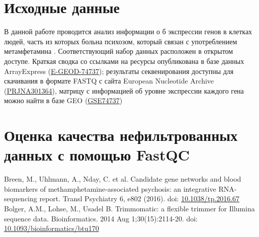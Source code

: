\documentclass[a4paper,12pt]{article}
\begin{document}


\section{Исходные данные}

В данной работе проводится анализ информации о б экспрессии генов в клетках людей, часть из которых больна психозом, который связан с употреблением метамфетамина \cite{breen}.
Соответствующий набор данных расположен в открытом доступе. Краткая сводка со ссылками на ресурсы опубликована в базе данных ArrayExpress (\href{https://www.ebi.ac.uk/arrayexpress/experiments/E-GEOD-74737/}{E-GEOD-74737}); результаты секвенирования доступны для скачивания в формате FASTQ с сайта European Nucleotide Archive (\href{https://www.ebi.ac.uk/ena/browser/view/PRJNA301364}{PRJNA301364}), матрицу с информацией об уровне экспрессии каждого гена можно найти в базе GEO (\href{https://www.ncbi.nlm.nih.gov/geo/query/acc.cgi?acc=GSE74737}{GSE74737})

\section{Оценка качества нефильтрованных данных с помощью FastQC}


\begin{thebibliography}{99}
     Breen, M., Uhlmann, A., Nday, C. et al. Candidate gene networks and blood biomarkers of methamphetamine-associated psychosis: an integrative RNA-sequencing report. Transl Psychiatry 6, e802 (2016). doi: \href{https://doi.org/10.1038/tp.2016.67}{10.1038/tp.2016.67}
     Bolger, A.M., Lohse, M., Usadel B. Trimmomatic: a flexible trimmer for Illumina sequence data. Bioinformatics. 2014 Aug 1;30(15):2114-20. doi: \href{https://doi.org/10.1093/bioinformatics/btu170}{10.1093/bioinformatics/btu170}
\end{thebibliography}
\end{document}
